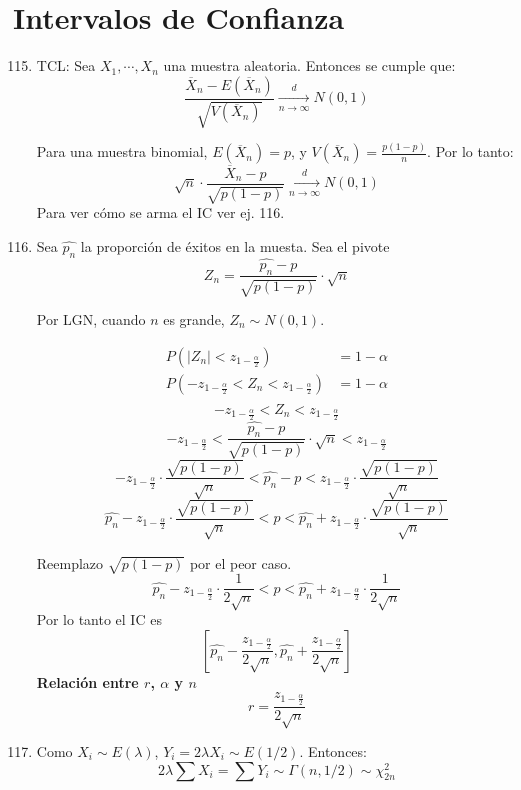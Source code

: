 \section{Intervalos de Confianza}
\begin{enumerate}
	\setcounter{enumi}{114}
	\item
		TCL: Sea $X_1, \cdots, X_n$ una muestra aleatoria. Entonces se cumple que:
		$$\frac{\overline X_n - E(\overline X_n)}{\sqrt{V(\overline X_n)}}\xrightarrow[n\rightarrow\infty]{d} N(0,1)$$
		
		Para una muestra binomial, $E(\overline X_n) = p$, y $V(\overline X_n) = \frac{p(1-p)}{n}$. Por lo tanto:
		$$\sqrt{n}\cdot \frac{\overline X_n - p}{\sqrt{p(1-p)}}\xrightarrow[n\rightarrow\infty]{d} N(0,1)$$
		Para ver cómo se arma el IC ver ej. 116.
	\item
		Sea $\hat{p_n}$ la proporción de éxitos en la muesta.
		Sea el pivote $$Z_n = \frac{\hat{p_n} - p}{\sqrt{p(1-p)}}\cdot \sqrt{n}$$
		
		Por LGN, cuando $n$ es grande, $Z_n\sim N(0,1)$.
		
		\begin{align*}
			P(|Z_n| < z_{1-\frac{\alpha}{2}})							& = 1-\alpha	\\
			P(-z_{1-\frac{\alpha}{2}} < Z_n < z_{1-\frac{\alpha}{2}})	& = 1-\alpha	\\
		\end{align*}
		$$-z_{1-\frac{\alpha}{2}} < Z_n < z_{1-\frac{\alpha}{2}}$$
		$$-z_{1-\frac{\alpha}{2}} <  \frac{\hat{p_n} - p}{\sqrt{p(1-p)}}\cdot \sqrt{n} < z_{1-\frac{\alpha}{2}}$$
		$$-z_{1-\frac{\alpha}{2}}\cdot \frac{\sqrt{p(1-p)}}{\sqrt{n}} <  \hat{p_n} - p < z_{1-\frac{\alpha}{2}}\cdot \frac{\sqrt{p(1-p)}}{\sqrt{n}}$$
		$$\hat{p_n} - z_{1-\frac{\alpha}{2}}\cdot \frac{\sqrt{p(1-p)}}{\sqrt{n}} < p < \hat{p_n} + z_{1-\frac{\alpha}{2}}\cdot \frac{\sqrt{p(1-p)}}{\sqrt{n}}$$
		
		Reemplazo $\sqrt{p(1-p)}$ por el peor caso.
		$$\hat{p_n} - z_{1-\frac{\alpha}{2}}\cdot \frac{1}{2\sqrt{n}} < p < \hat{p_n} + z_{1-\frac{\alpha}{2}}\cdot \frac{1}{2\sqrt{n}}$$
		Por lo tanto el IC es
		$$\left[\hat{p_n} - \frac{z_{1-\frac{\alpha}{2}}}{2\sqrt{n}}, \hat{p_n} + \frac{z_{1-\frac{\alpha}{2}}}{2\sqrt{n}}\right]$$
		\textbf{Relación entre $r$, $\alpha$ y $n$}
		$$r = \frac{z_{1-\frac{\alpha}{2}}}{2\sqrt{n}}$$
	\item
		Como $X_i\sim E(\lambda)$, $Y_i = 2\lambda X_i \sim E(1/2)$.
		Entonces:
		$$2\lambda\sum X_i = \sum Y_i \sim \Gamma(n, 1/2) \sim \chi^2_{2n}$$
		

\end{enumerate}
